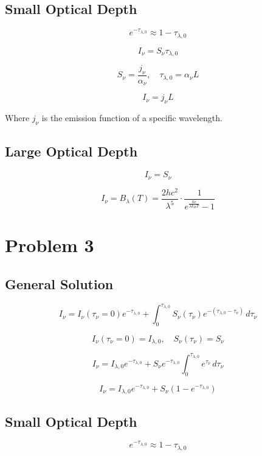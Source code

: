 \documentclass[12pt]{article}
\begin{document}
\subsection{Small Optical Depth}

\[
    e^{-\tau_{\lambda,0}} \approx 1 - \tau_{\lambda,0}
\]

\[
    I_\nu = S_\nu \tau_{\lambda,0}
\]

\[
    S_\nu = \frac{j_\nu}{\alpha_\nu},\quad \tau_{\lambda,0} = \alpha_\nu L
\]

\[
    I_\nu = j_\nu L
\]

Where $j_\nu$ is the emission function of a specific wavelength.

\subsection{Large Optical Depth}

\[
    I_\nu = S_\nu
\]

\[
    I_\nu = B_\lambda(T) = \frac{2 h c^2}{\lambda^5} \cdot \frac{1}{e^{\frac{h c}{\lambda k_B T}} - 1}
\]

\newpage

\section{Problem 3}

\subsection{General Solution}

\[
    I_\nu = I_\nu(\tau_\nu=0) e^{-\tau_{\lambda,0}} + \int_{0}^{\tau_{\lambda,0}} S_\nu(\tau_\nu) e^{-(\tau_{\lambda,0} - \tau_\nu)} \, d\tau_\nu
\]

\[
    I_\nu(\tau_\nu=0) = I_{\lambda,0},\quad S_\nu(\tau_\nu) = S_\nu
\]

\[
    I_\nu = I_{\lambda,0} e^{-\tau_{\lambda,0}} + S_\nu e^{-\tau_{\lambda,0}} \int_{0}^{\tau_{\lambda,0}} e^{\tau_\nu} \, d\tau_\nu
\]

\[
    I_\nu = I_{\lambda,0} e^{-\tau_{\lambda,0}} + S_\nu (1 - e^{-\tau_{\lambda,0}})
\]

\subsection{Small Optical Depth}

\[
    e^{-\tau_{\lambda,0}} \approx 1 - \tau_{\lambda,0}
\]
\end{document}
